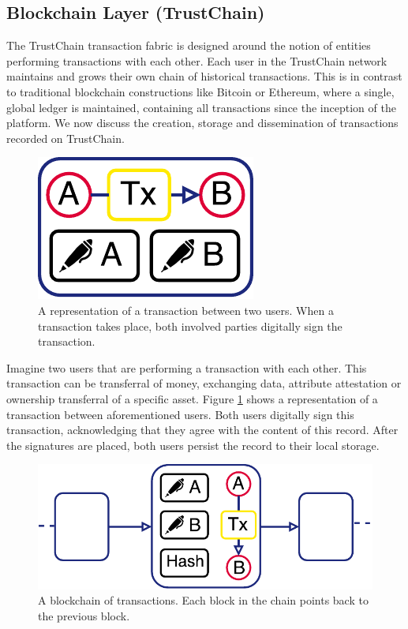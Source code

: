 \documentclass[USenglish]{article}
\begin{document}
\subsection{Blockchain Layer (TrustChain)}
\label{sec:trustchain}
The TrustChain transaction fabric is designed around the notion of entities performing transactions with each other.
Each user in the TrustChain network maintains and grows their own chain of historical transactions. 
This is in contrast to traditional blockchain constructions like Bitcoin or Ethereum, where a single, global ledger is maintained, containing all transactions since the inception of the platform.
We now discuss the creation, storage and dissemination of transactions recorded on TrustChain.

\begin{figure}[h!]
	\centering
	\includegraphics[width=0.3\columnwidth]{assets/trustchain_tutorial_1}
	\caption{A representation of a transaction between two users. When a transaction takes place, both involved parties digitally sign the transaction.}
	\label{fig:trustchain_tutorial_1}
\end{figure}

Imagine two users that are performing a transaction with each other.
This transaction can be transferral of money, exchanging data, attribute attestation or ownership transferral of a specific asset.
Figure \ref{fig:trustchain_tutorial_1} shows a representation of a transaction between aforementioned users.
Both users digitally sign this transaction, acknowledging that they agree with the content of this record.
After the signatures are placed, both users persist the record to their local storage.

\begin{figure}[h!]
	\centering
	\includegraphics[width=0.7\columnwidth]{assets/trustchain_tutorial_2}
	\caption{A blockchain of transactions. Each block in the chain points back to the previous block.}
	\label{fig:trustchain_tutorial_2}
\end{figure}
\end{document}
